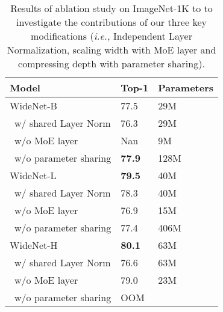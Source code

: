 \documentclass[letterpaper]{article} \usepackage{aaai22}  \usepackage{times}  \usepackage{helvet}  \usepackage{courier}  \usepackage[hyphens]{url}  \usepackage{graphicx} \urlstyle{rm} \def\UrlFont{\rm}  \usepackage{natbib}  \usepackage{caption} \DeclareCaptionStyle{ruled}{labelfont=normalfont,labelsep=colon,strut=off} \frenchspacing  \setlength{\pdfpagewidth}{8.5in}  \setlength{\pdfpageheight}{11in}  \usepackage{algorithm}
\newcommand{\ie}{\emph{i.e.,}\xspace}
\begin{document}
\begin{table}[t]
\centering
\caption{Results of ablation study on ImageNet-1K to to investigate the contributions of our three key modifications (\ie Independent Layer Normalization, scaling width with MoE layer and compressing depth with parameter sharing).}
\label{tbl-abaltion-pretraining-ImageNet}
\begin{tabular}{l|ll}
\toprule
Model                                   & Top-1 & Parameters \\ \midrule
WideNet-B               & 77.5 & 29M        \\
~w/ shared Layer Norm & 76.3          & 29M                 \\
~w/o MoE layer                    & Nan            & 9M                  \\
~w/o parameter sharing            & \textbf{77.9} & 128M                \\ \midrule
WideNet-L              & \textbf{79.5} & 40M                 \\
~w/ shared Layer Norm    &      78.3          &   40M                  \\
~w/o MoE layer                    & 76.9          & 15M        \\
~w/o parameter sharing            & 77.4          & 406M                \\ \midrule
WideNet-H              & \textbf{80.1} & 63M                 \\
~w/ shared Layer Norm   &     76.6           &     63M                \\
~w/o MoE layer                    & 79.0          & 23M        \\
~w/o parameter sharing            & OOM            &      \\
\bottomrule
\end{tabular}
\end{table}
\end{document}
